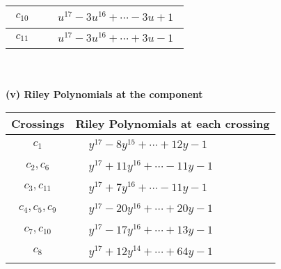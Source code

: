 \documentclass[1p]{elsarticle_modified}
\theoremstyle{definition}
\begin{document}
\begin{tabular}{m{50pt}|m{274pt}}
\hline $$\begin{aligned}c_{10}\end{aligned}$$&$\begin{aligned}
&u^{17}-3 u^{16}+\cdots-3 u+1
\end{aligned}$\\
\hline $$\begin{aligned}c_{11}\end{aligned}$$&$\begin{aligned}
&u^{17}-3 u^{16}+\cdots+3 u-1
\end{aligned}$\\
\hline
\end{tabular}\\~\\
\newpage\renewcommand{\arraystretch}{1}
\flushleft \textbf{(v) Riley Polynomials at the component}\newline \\
\begin{tabular}{m{50pt}|m{274pt}}
Crossings & \hspace{64pt}Riley Polynomials at each crossing \\
\hline $$\begin{aligned}c_{1}\end{aligned}$$&$\begin{aligned}
&y^{17}-8 y^{15}+\cdots+12 y-1
\end{aligned}$\\
\hline $$\begin{aligned}c_{2},c_{6}\end{aligned}$$&$\begin{aligned}
&y^{17}+11 y^{16}+\cdots-11 y-1
\end{aligned}$\\
\hline $$\begin{aligned}c_{3},c_{11}\end{aligned}$$&$\begin{aligned}
&y^{17}+7 y^{16}+\cdots-11 y-1
\end{aligned}$\\
\hline $$\begin{aligned}c_{4},c_{5},c_{9}\end{aligned}$$&$\begin{aligned}
&y^{17}-20 y^{16}+\cdots+20 y-1
\end{aligned}$\\
\hline $$\begin{aligned}c_{7},c_{10}\end{aligned}$$&$\begin{aligned}
&y^{17}-17 y^{16}+\cdots+13 y-1
\end{aligned}$\\
\hline $$\begin{aligned}c_{8}\end{aligned}$$&$\begin{aligned}
&y^{17}+12 y^{14}+\cdots+64 y-1
\end{aligned}$\\
\hline
\end{tabular}\\~\\
\end{document}
